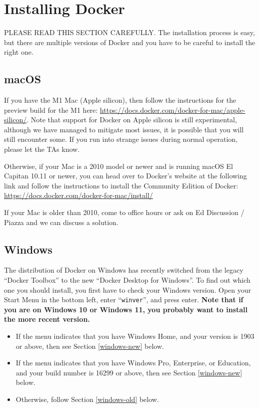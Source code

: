 \section{Installing Docker}

PLEASE READ THIS SECTION CAREFULLY. The installation process is easy, but there are multiple versions of Docker and you have to be careful to install the right one.

\subsection{macOS}

If you have the M1 Mac (Apple silicon), then follow the instructions for the preview build for the M1 here: \url{https://docs.docker.com/docker-for-mac/apple-silicon/}. Note that support for Docker on Apple silicon is still experimental, although we have managed to mitigate most issues, it is possible that you will still encounter some. If you run into strange issues during normal operation, please let the TAs know.

Otherwise, if your Mac is a 2010 model or newer and is running macOS El Capitan 10.11 or newer, you can head over to Docker’s website at the following link and follow the instructions to install the Community Edition of Docker: \url{https://docs.docker.com/docker-for-mac/install/}

If your Mac is older than 2010, come to office hours or ask on Ed Discussion / Piazza and we can discuss a solution.

\subsection{Windows}

The distribution of Docker on Windows has recently switched from the legacy ``Docker Toolbox'' to the new ``Docker Desktop for Windows''. To find out which one you should install, you first have to check your Windows version. Open your Start Menu in the bottom left, enter ``\texttt{winver}'', and press enter. \textbf{Note that if you are on Windows 10 or Windows 11, you probably want to install the more recent version.}

\begin{itemize}
    \item If the menu indicates that you have Windows Home, and your version is 1903 or above, then see Section \ref{windows-new} below.
    \item If the menu indicates that you have Windows Pro, Enterprise, or Education, and your build number is 16299 or above, then see Section \ref{windows-new} below.
    \item Otherwise, follow Section \ref{windows-old} below.
\end{itemize}

